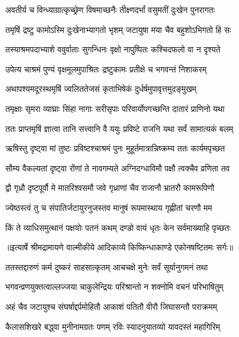 \twolineshloka
{अवतीर्य च विन्ध्याग्रात्कृच्छ्रेण विषमाच्छनैः}
{तीक्ष्णदर्भां वसुमतीं दुःखेन पुनरागतः} %

\twolineshloka
{तमृषिं द्रष्टु कामोऽस्मि दुःखेनाभ्यागतो भृशम्}
{जटायुषा मया चैव बहुशोऽभिगतो हि सः} %

\twolineshloka
{तस्याश्रमपदाभ्याशे ववुर्वाताः सुगन्धिनः}
{वृक्षो नापुष्पितः कश्चिदफलो वा न दृश्यते} %

\twolineshloka
{उपेत्य चाश्रमं पुण्यं वृक्षमूलमुपाश्रितः}
{द्रष्टुकामः प्रतीक्षे च भगवन्तं निशाकरम्} %

\twolineshloka
{अथापश्यमदूरस्थमृषिं ज्वलिततेजसं}
{कृताभिषेकं दुर्धर्षमुपावृत्तमुदङ्मुखम्} %

\twolineshloka
{तमृक्षाः सृमरा व्याघ्राः सिंहा नागाः सरीसृपाः}
{परिवार्योपगच्छन्ति दातारं प्राणिनो यथा} %

\twolineshloka
{ततः प्राप्तमृषिं ज्ञात्वा तानि सत्त्वानि वै ययुः}
{प्रविष्टे राजनि यथा सर्वं सामात्यकं बलम्} %

\twolineshloka
{ऋषिस्तु दृष्ट्वा मां तुष्टः प्रविष्टश्चाश्रमं पुनः}
{मुहूर्तमात्रान्निष्क्रम्य ततः कार्यमपृच्छत} %

\twolineshloka
{सौम्य वैकल्यतां दृष्ट्वा रोंणां ते नावगम्यते}
{अग्निदग्धाविमौ पक्षौ त्वक्चैव व्रणिता तव} %

\twolineshloka
{द्वौ गृध्रौ दृष्टपूर्वौ मे मातरिश्वसमौ जवे}
{गृध्राणां चैव राजानौ भ्रातरौ कामरूपिणौ} %

\twolineshloka
{ज्येष्ठस्त्वं तु च संपातिर्जटायुरनुजस्तव}
{मानुषं रूपमास्थाय गृह्णीतां चरणौ मम} %

\twolineshloka
{किं ते व्याधिसमुत्थानं पक्षयोः पतनं कथम्}
{दण्डो वायं धृतः केन सर्वमाख्याहि पृच्छतः} %


{॥इत्यार्षे श्रीमद्रामायणे वाल्मीकीये आदिकाव्ये किष्किन्धाकाण्डे एकोनषष्टितमः सर्गः॥}


\twolineshloka
{ततस्तद्दारुणं कर्म दुष्करं साहसात्कृतम्}
{आचचक्षे मुनेः सर्वं सूर्यानुगमनं तथा} %

\twolineshloka
{भगवन्व्रणयुक्तत्वाल्लज्जया चाकुलेन्द्रियः}
{परिश्रान्तो न शक्नोमि वचनं परिभाषितुम्} %

\twolineshloka
{अहं चैव जटायुश्च संघर्षाद्दर्पमोहितौ}
{आकाशं पतितौ वीरौ जिघासन्तौ पराक्रमम्} %

\twolineshloka
{कैलासशिखरे बद्ध्वा मुनीनामग्रतः पणम्}
{रविः स्यादनुयातव्यो यावदस्तं महागिरिम्} %

